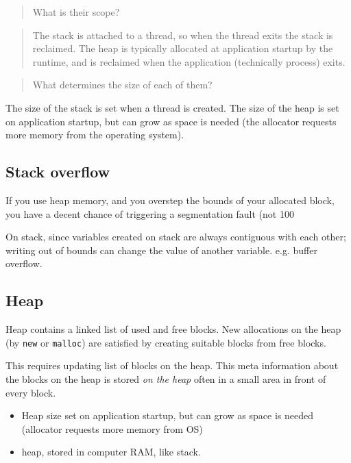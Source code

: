 \documentclass[10pt]{amsart}
\begin{document}
\begin{multicols*}{2}
\begin{quotation}
What is their scope?
\end{quotation}

\begin{quotation}
The stack is attached to a thread, so when the thread exits the stack is reclaimed. The heap is typically allocated at application startup by the runtime, and is reclaimed when the application (technically process) exits.
\end{quotation}

\begin{quotation}
What determines the size of each of them?
\end{quotation}

The size of the stack is set when a thread is created. The size of the heap is set on application startup, but can grow as space is needed (the allocator requests more memory from the operating system).




\subsection{Stack overflow}  

If you use heap memory, and you overstep the bounds of your allocated block, you have a decent chance of triggering a segmentation fault (not 100%

On stack, since variables created on stack are always contiguous with each other; writing out of bounds can change the value of another variable.  e.g. buffer overflow.  

\subsection{Heap}  

Heap contains a linked list of used and free blocks.  New allocations on the heap (by \verb|new| or \verb|malloc|) are satisfied by creating suitable blocks from free blocks.  

This requires updating list of blocks on the heap.  This meta information about the blocks on the heap is stored \emph{on the heap} often in a small area in front of every block.  

\begin{itemize}
	\item Heap size set on application startup, but can grow as space is needed (allocator requests more memory from OS)
	\item heap, stored in computer RAM, like stack.
\end{itemize}


\end{multicols*}
\end{document}
